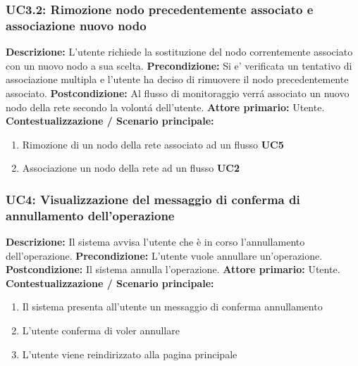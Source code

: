                 \subsubsection{UC3.2: Rimozione nodo precedentemente associato e associazione nuovo nodo}
                    \textbf{Descrizione:} L’utente richiede la sostituzione del nodo correntemente associato con un nuovo nodo a sua scelta.
                    \newline
                    \textbf{Precondizione:}  Si e’ verificata un tentativo di associazione multipla e l’utente ha deciso di rimuovere il nodo precedentemente associato.
                    \newline
                    \textbf{Postcondizione:} Al flusso di monitoraggio verrá associato un nuovo nodo della rete secondo la volontá dell’utente.
                    \newline
                    \textbf{Attore primario:} Utente.
                    \newline
                    \textbf{Contestualizzazione / Scenario principale:} \begin{enumerate}
                        \item Rimozione di un nodo della rete associato ad un flusso \textbf{UC5}
                        \item Associazione un nodo della rete ad un flusso \textbf{UC2}
                    \end{enumerate}
                    
                \subsubsection{UC4: Visualizzazione del messaggio di conferma di annullamento dell'operazione}
                    \textbf{Descrizione:} Il sistema avvisa l’utente che è in corso l’annullamento dell’operazione.
                    \newline
                    \textbf{Precondizione:} L’utente vuole annullare un’operazione.
                    \newline
                    \textbf{Postcondizione:} Il sistema annulla l’operazione.
                    \newline
                    \textbf{Attore primario:} Utente.
                    \newline
                    \textbf{Contestualizzazione / Scenario principale:} \begin{enumerate}
                        \item Il sistema presenta all’utente un messaggio di conferma annullamento
                        \item L’utente conferma di voler annullare 
                        \item L’utente viene reindirizzato alla pagina principale
                    \end{enumerate}
                    
